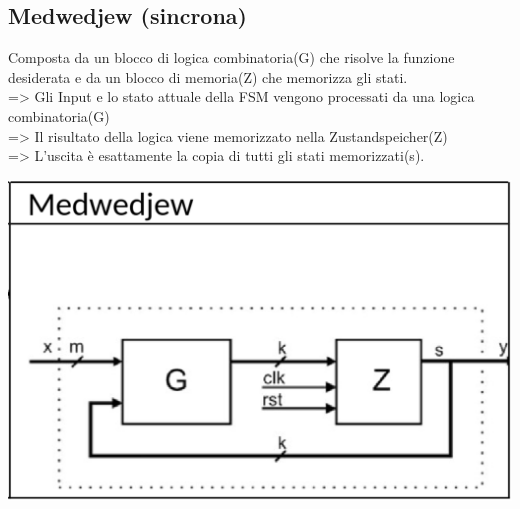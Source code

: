     \subsection{Medwedjew (sincrona)}
    \begin{minipage}[t]{0.48\columnwidth}
        \vspace{0pt} %
        Composta da un blocco di logica combinatoria(G) che risolve la funzione desiderata e da un blocco di memoria(Z)
        che memorizza gli stati.\\ 
        => Gli Input e lo stato attuale della FSM vengono processati da una logica combinatoria(G)\\
        => Il risultato della logica viene memorizzato nella Zustandspeicher(Z)\\
        => L'uscita è esattamente la copia di tutti gli stati memorizzati(s).
    \end{minipage}%
    \hfill
    \begin{minipage}[t]{0.48\columnwidth}
        \vspace{0pt} %
        \includegraphics[width=\linewidth]{Images/Medwedjew.png}
    \end{minipage}

